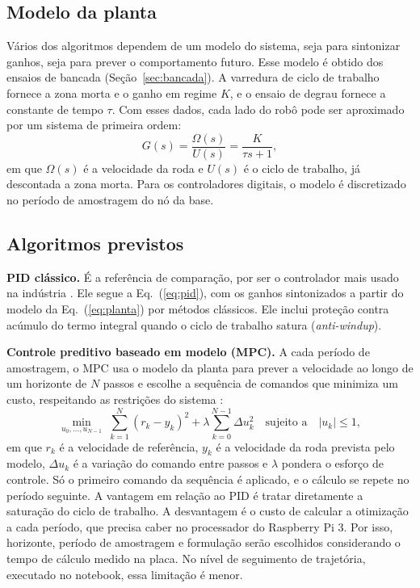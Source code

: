 \subsection{Modelo da planta}

Vários dos algoritmos dependem de um modelo do sistema, seja para
sintonizar ganhos, seja para prever o comportamento futuro. Esse modelo é
obtido dos ensaios de bancada (Seção~\ref{sec:bancada}). A varredura de
ciclo de trabalho fornece a zona morta e o ganho em regime $K$, e o ensaio
de degrau fornece a constante de tempo $\tau$. Com esses dados, cada lado
do robô pode ser aproximado por um sistema de primeira ordem:
\begin{equation}
	\label{eq:planta}
	G(s) = \frac{\Omega(s)}{U(s)} = \frac{K}{\tau s + 1},
\end{equation}
em que $\Omega(s)$ é a velocidade da roda e $U(s)$ é o ciclo de trabalho,
já descontada a zona morta. Para os controladores digitais, o modelo é
discretizado no período de amostragem do nó da base.

\subsection{Algoritmos previstos}

\textbf{PID clássico.} É a referência de comparação, por ser o controlador
mais usado na indústria \cite{astrom2006}. Ele segue a Eq.~(\ref{eq:pid}),
com os ganhos sintonizados a partir do modelo da Eq.~(\ref{eq:planta})
por métodos clássicos. Ele inclui proteção contra acúmulo do termo
integral quando o ciclo de trabalho satura (\textit{anti-windup}).

\textbf{Controle preditivo baseado em modelo (MPC).} A cada período de
amostragem, o MPC usa o modelo da planta para prever a velocidade ao longo
de um horizonte de $N$ passos e escolhe a sequência de comandos que
minimiza um custo, respeitando as restrições do sistema
\cite{camacho2007}:
\begin{equation}
	\label{eq:mpc}
	\min_{u_0,\ldots,u_{N-1}} \; \sum_{k=1}^{N}
		\left(r_k - y_k\right)^2 + \lambda \sum_{k=0}^{N-1} \Delta u_k^2
	\quad \mbox{sujeito a} \quad |u_k| \le 1,
\end{equation}
em que $r_k$ é a velocidade de referência, $y_k$ é a velocidade da roda
prevista pelo modelo, $\Delta u_k$ é a variação do comando entre passos e
$\lambda$ pondera o esforço de controle. Só o primeiro comando da
sequência é aplicado, e o cálculo se repete no período seguinte. A
vantagem em relação ao PID é tratar diretamente a saturação do ciclo de
trabalho. A desvantagem é o custo de calcular a otimização a cada
período, que precisa caber no processador do Raspberry Pi 3. Por isso,
horizonte, período de amostragem e formulação serão escolhidos
considerando o tempo de cálculo medido na placa. No nível de seguimento de
trajetória, executado no notebook, essa limitação é menor.

